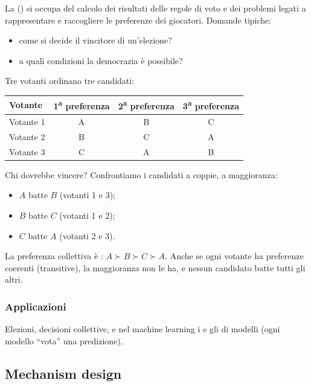 La  () si occupa del calcolo
dei risultati delle regole di voto e dei problemi legati a rappresentare e raccogliere
le preferenze dei giocatori. Domande tipiche:
\begin{itemize}
  \item come si decide il vincitore di un'elezione?
  \item a quali condizioni la democrazia è possibile?
\end{itemize}

\begin{esempio}
Tre votanti ordinano tre candidati:
\begin{center}
\renewcommand{\arraystretch}{1.2}
\begin{tabular}{lccc}
\toprule
Votante & 1\textsuperscript{a} preferenza & 2\textsuperscript{a} preferenza & 3\textsuperscript{a} preferenza \\
\midrule
Votante 1 & A & B & C \\
Votante 2 & B & C & A \\
Votante 3 & C & A & B \\
\bottomrule
\end{tabular}
\end{center}
Chi dovrebbe vincere? Confrontiamo i candidati a coppie, a maggioranza:
\begin{itemize}
  \item $A$ batte $B$ (votanti 1 e 3);
  \item $B$ batte $C$ (votanti 1 e 2);
  \item $C$ batte $A$ (votanti 2 e 3).
\end{itemize}
La preferenza collettiva è : $A \succ B \succ C \succ A$.
Anche se ogni votante ha preferenze coerenti (transitive), la maggioranza non le ha,
e nessun candidato batte tutti gli altri.
\end{esempio}

\subsubsection*{Applicazioni}
Elezioni, decisioni collettive, e nel machine learning i  e gli
 di modelli (ogni modello ``vota'' una predizione).

\subsection{Mechanism design}

